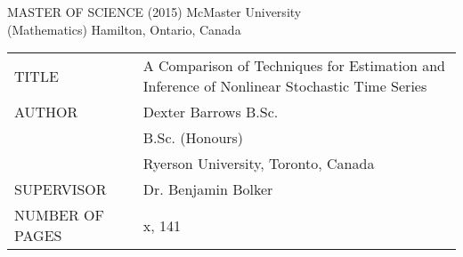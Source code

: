\newpage
\thispagestyle{empty}
\centering
\null


MASTER OF SCIENCE (2015) 	\hfill 	McMaster University \\
(Mathematics)				\hfill	Hamilton, Ontario, Canada \\

\vspace{3cm}

\begin{tabular}{p{7cm}p{7cm}}
	TITLE 			& A Comparison of Techniques for Estimation and Inference of Nonlinear Stochastic Time Series \\
	AUTHOR 			& Dexter Barrows B.Sc. \\
					& B.Sc. (Honours) \\
					& Ryerson University, Toronto, Canada \\
	SUPERVISOR 		& Dr. Benjamin Bolker \\
	NUMBER OF PAGES & x, 141 \\
\end{tabular}